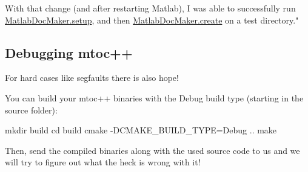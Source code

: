 With that change (and after restarting Matlab), I was able to successfully run \hyperlink{class_matlab_doc_maker_a434c176c2421dd18a40003919b19f4f2}{Matlab\+Doc\+Maker.\+setup}, and then \hyperlink{class_matlab_doc_maker_a278883e6b83f6c6e7780e0d567dee119}{Matlab\+Doc\+Maker.\+create} on a test directory."\hypertarget{troubleshooting_ts_debug}{}\subsection{Debugging mtoc++}\label{troubleshooting_ts_debug}
For hard cases like segfaults there is also hope!

You can build your mtoc++ binaries with the {\ttfamily Debug} build type (starting in the source folder)\+: 
\begin{DoxyCode}
mkdir build
cd build
cmake -DCMAKE\_BUILD\_TYPE=Debug ..
make
\end{DoxyCode}
 Then, send the compiled binaries along with the used source code to us and we will try to figure out what the heck is wrong with it! 
